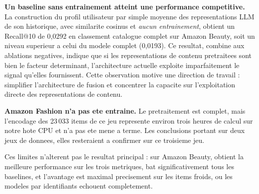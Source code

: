 \textbf{Un baseline sans entrainement atteint une performance competitive.} La
construction du profil utilisateur par simple moyenne des representations LLM
de son historique, avec similarite cosinus et \emph{aucun entrainement},
obtient un Recall@10 de 0,0292 en classement catalogue complet sur Amazon
Beauty, soit un niveau superieur a celui du modele complet (0,0193). Ce
resultat, combine aux ablations negatives, indique que si les representations
de contenu pretraitees sont bien le facteur determinant, l'architecture
actuelle exploite imparfaitement le signal qu'elles fournissent. Cette
observation motive une direction de travail : simplifier l'architecture de
fusion et concentrer la capacite sur l'exploitation directe des
representations de contenu.

\textbf{Amazon Fashion n'a pas ete entraine.} Le pretraitement est complet,
mais l'encodage des 23\,033 items de ce jeu represente environ trois heures de
calcul sur notre hote CPU et n'a pas ete mene a terme. Les conclusions portant
sur deux jeux de donnees, elles resteraient a confirmer sur ce troisieme jeu.

Ces limites n'alterent pas le resultat principal : sur Amazon Beauty,
\model{} obtient la meilleure performance sur les trois metriques, bat
significativement tous les baselines, et l'avantage est maximal precisement sur
les items froids, ou les modeles par identifiants echouent completement.
